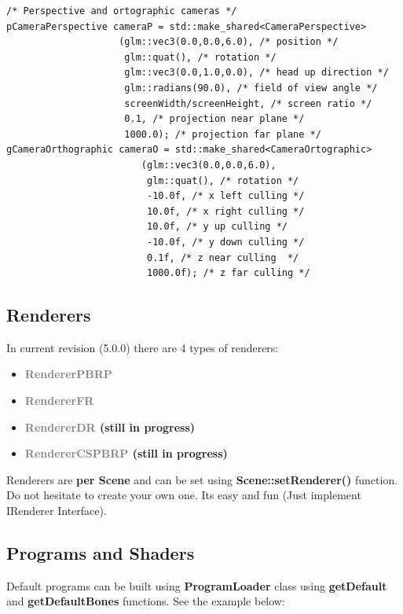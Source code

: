 \documentclass{article}
\begin{document}
\begin{lstlisting}
/* Perspective and ortographic cameras */
pCameraPerspective cameraP = std::make_shared<CameraPerspective>                
                    (glm::vec3(0.0,0.0,6.0), /* position */
                     glm::quat(), /* rotation */                
                     glm::vec3(0.0,1.0,0.0), /* head up direction */         
                     glm::radians(90.0), /* field of view angle */        
                     screenWidth/screenHeight, /* screen ratio */
                     0.1, /* projection near plane */
                     1000.0); /* projection far plane */
gCameraOrthographic cameraO = std::make_shared<CameraOrtographic> 
                        (glm::vec3(0.0,0.0,6.0),
                         glm::quat(), /* rotation */                
                         -10.0f, /* x left culling */
                         10.0f, /* x right culling */
                         10.0f, /* y up culling */
                         -10.0f, /* y down culling */
                         0.1f, /* z near culling  */
                         1000.0f); /* z far culling */
\end{lstlisting}

\subsection{Renderers}\label{sec:Renderers}

\indent \indent In current revision (5.0.0) there are 4 types of renderers:

\begin{itemize}
\item \textbf{\textcolor{gray}{RendererPBRP}}
\item \textbf{\textcolor{gray}{RendererFR}}
\item \textbf{\textcolor{gray}{RendererDR} (still in progress)}
\item \textbf{\textcolor{gray}{RendererCSPBRP} (still in progress)}
\end{itemize}

\indent \indent Renderers are \textbf{per Scene} and can be set using \textbf{Scene::setRenderer()} function. Do not hesitate to create your own one. Its easy and fun (Just implement IRenderer Interface).

\subsection{Programs and Shaders}\label{sec:Programs and Shaders}
\indent \indent Default programs can be built using \textbf{ProgramLoader} class using \textbf{getDefault} and \textbf{getDefaultBones} functions. See the example below:
\end{document}
